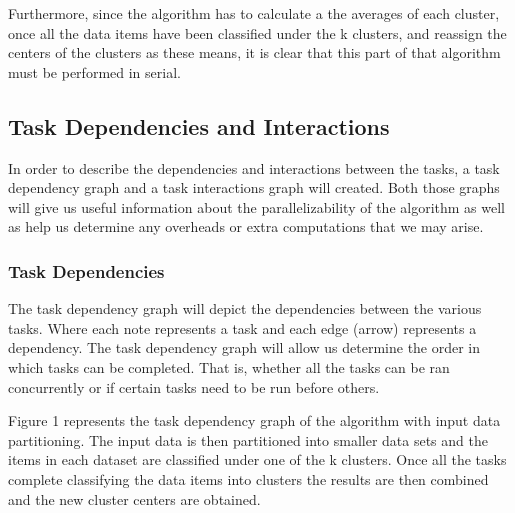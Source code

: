 \documentclass[12pt]{article}
\begin{document}
    		\begin{flushleft}
    			Furthermore, since the algorithm has to calculate a the averages of each cluster, once all the data items have been classified under the k clusters, and reassign the centers of the clusters as these means, it is clear that this part of that algorithm must be performed in serial.
    		\end{flushleft}
    	
    	\subsection{Task Dependencies and Interactions}
    		\begin{flushleft}
    			In order to describe the dependencies and interactions between the tasks, a task dependency graph and a task interactions graph will created. Both those graphs will give us useful information about the parallelizability of the algorithm as well as help us determine any overheads or extra computations that we may arise.
    		\end{flushleft}
    		
    		\subsubsection{Task Dependencies}
    			\begin{flushleft}
    				The task dependency graph will depict the dependencies between the various tasks. Where each note represents a task and each edge (arrow) represents a dependency. The task dependency graph will allow us determine the order in which tasks can be completed. That is, whether all the tasks can be ran concurrently or if certain tasks need to be run before others.
    			\end{flushleft}
    			
    			\begin{flushleft}
    				Figure 1 represents the task dependency graph of the algorithm with input data partitioning. The input data is then partitioned into smaller data sets and the items in each dataset are classified under one of the k clusters. Once all the tasks complete classifying the data items into clusters the results are then combined and the new cluster centers are obtained.
    			\end{flushleft}
    			
\end{document}
